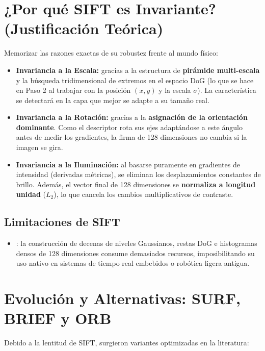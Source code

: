 \section{¿Por qué SIFT es Invariante? (Justificación Teórica)}
Memorizar las razones exactas de su robustez frente al mundo físico:
\begin{itemize}
    \item \textbf{Invariancia a la Escala:} gracias a la estructura de \textbf{pirámide multi-escala} y la búsqueda tridimensional de extremos en el espacio DoG (lo que se hace en Paso 2 al trabajar con la posición $(x,y)$ y la escala $\sigma$). La característica se detectará en la capa que mejor se adapte a su tamaño real.
    \item \textbf{Invariancia a la Rotación:} gracias a la \textbf{asignación de la orientación dominante}. Como el descriptor rota sus ejes adaptándose a este ángulo antes de medir los gradientes, la firma de 128 dimensiones no cambia si la imagen se gira.
    \item \textbf{Invariancia a la Iluminación:} al basarse puramente en gradientes de intensidad (derivadas métricas), se eliminan los desplazamientos constantes de brillo. Además, el vector final de 128 dimensiones se \textbf{normaliza a longitud unidad} ($L_2$), lo que cancela los cambios multiplicativos de contraste.
\end{itemize}

\subsection{Limitaciones de SIFT}
\begin{itemize}
    \item {}: la construcción de decenas de niveles Gaussianos, restas DoG e histogramas densos de 128 dimensiones consume demasiados recursos, imposibilitando su uso nativo en sistemas de tiempo real embebidos o robótica ligera antigua.
\end{itemize}


\section{Evolución y Alternativas: SURF, BRIEF y ORB}
Debido a la lentitud de SIFT, surgieron variantes optimizadas en la literatura:

